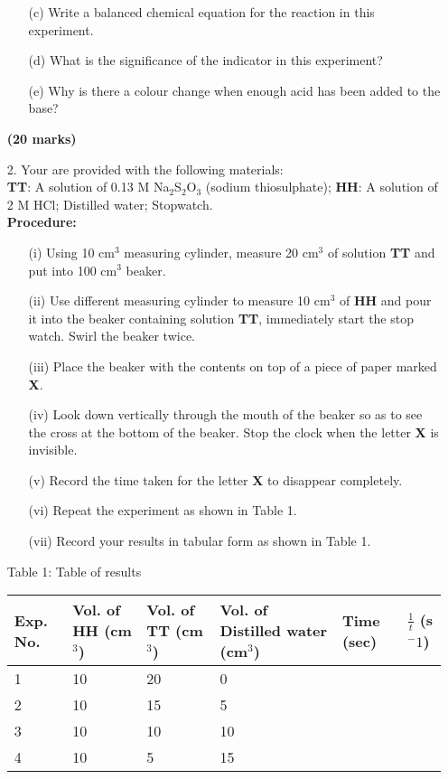 \begin{enumerate}
\begin{enumerate}
\item[(c)] Write a balanced chemical equation for the reaction in this experiment.
\item[(d)] What is the significance of the indicator in this experiment?
\item[(e)] Why is there a colour change when enough acid has been added to the base?

\end{enumerate}
\raggedleft \textbf{(20 marks)}

\raggedright

\item[2.] Your are provided with the following materials:\\
\textbf{TT}:  A solution of 0.13 M Na$_2$S$_2$O$_3$ (sodium thiosulphate);
\textbf{HH}:  A solution of 2 M HCl;
Distilled water;
Stopwatch.\\
\vspace{6pt}
\textbf{Procedure:}\\
\vspace{-4pt}
\begin{enumerate}
\item[(i)] Using 10 cm$^3$ measuring cylinder, measure 20 cm$^3$ of solution \textbf{TT} and put into 100 cm$^3$ beaker.
\item[(ii)] Use different measuring cylinder to measure 10 cm$^3$ of \textbf{HH} and pour it into the beaker containing solution \textbf{TT}, immediately start the stop watch. Swirl the beaker twice.
\item[(iii)] Place the beaker with the contents on top of a piece of paper marked \textbf{X}.
\item[(iv)] Look down vertically through the mouth of the beaker so as to see the cross at the bottom of the beaker. Stop the clock when the letter \textbf{X} is invisible.
\item[(v)] Record the time taken for the letter \textbf{X} to disappear completely.
\item[(vi)] Repeat the experiment as shown in Table 1.
\item[(vii)] Record your results in tabular form as shown in Table 1.
\end{enumerate}

\indent Table 1: Table of results\\

\begin{center}
\begin{tabular}{|p{2cm}|p{2cm}|p{2cm}|p{2cm}|p{2.5cm}|p{2cm}|}
\hline
Exp. No.&Vol. of \textbf{HH} (cm$^3$)&Vol. of \textbf{TT} (cm$^3$)&Vol. of Distilled water (cm$^3$)&Time (sec)&$\frac{1}{t}$ (s$^-1$)\\ \hline
1&10&20&0&&\\ \hline
2&10&15&5&&\\ \hline
3&10&10&10&&\\ \hline
4&10&5&15&&\\ \hline
\end{tabular}
\end{center}


\end{enumerate}
